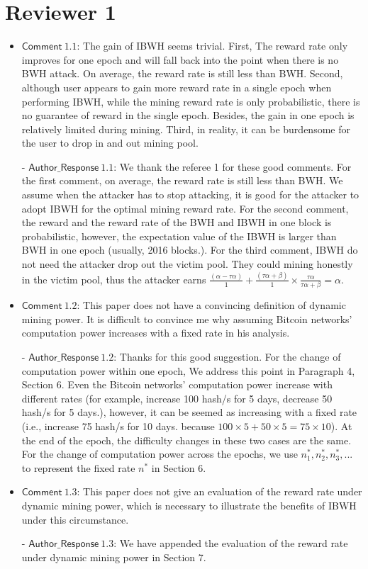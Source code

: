 \documentclass[]{article}
\newcommand{\AR}[1]{\mathsf{Author\_Response}\ #1}
\newcommand{\CM}[1]{{\mathsf{Comment}\ #1}}
\begin{document}
\section{Reviewer 1}
\begin{itemize}
	\item $\CM{1.1}$: The gain of IBWH seems trivial. First, The reward rate only improves for one epoch and will fall back into the point when there is no BWH attack. On average, the reward rate is still less than BWH. Second, although user appears to gain more reward rate in a single epoch when performing IBWH, while the mining reward rate is only probabilistic, there is no guarantee of reward in the single epoch. Besides, the gain in one epoch is relatively limited during mining. Third, in reality, it can be burdensome for the user to drop in and out mining pool.
	\item[-] $\AR{1.1}$: We thank the referee 1 for these good comments. For the first comment, on average, the reward rate is still less than BWH. We assume when the attacker has to stop attacking, it is good for the attacker to adopt IBWH for the optimal mining reward rate. For the second comment, the reward and the reward rate of the BWH and IBWH in one block is probabilistic, however, the expectation value of the IBWH is larger than BWH in one epoch (usually, 2016 blocks.). For the third comment, IBWH do not need the attacker drop out the victim pool. They could mining honestly in the victim pool, thus the attacker earns $\frac{(\alpha - \tau\alpha)}{1} + \frac{(\tau\alpha + \beta)}{1}\times\frac{\tau\alpha}{\tau\alpha + \beta} = \alpha$.
 
	
	\item $\CM{1.2}$: This paper does not have a convincing definition of dynamic mining power. It is difficult to convince me why assuming Bitcoin networks' computation power increases with a fixed rate in his analysis. 
	\item[-] $\AR{1.2}$: Thanks for this good suggestion. For the change of computation power within one epoch, We address this point in Paragraph 4, Section 6. Even the Bitcoin networks' computation power increase with different rates (for example, increase 100 hash/s for 5 days, decrease 50 hash/s for 5 days.), however, it can be seemed as increasing with a fixed rate (i.e., increase 75 hash/s for 10 days. because $100\times5 + 50\times5 = 75\times10$). At the end of the epoch, the difficulty changes in these two cases are the same. For the change of computation power across the epochs, we use $n_1^*, n_2^*, n_3^*,...$ to represent the fixed rate $n^*$ in Section 6.
	
	\item $\CM{1.3}$: This paper does not give an evaluation of the reward rate under dynamic mining power, which is necessary to illustrate the benefits of IBWH under this circumstance.
	
	\item[-] $\AR{1.3}$: We have appended the evaluation of the reward rate under dynamic mining power in Section 7.
 
\end{itemize}
\end{document}
